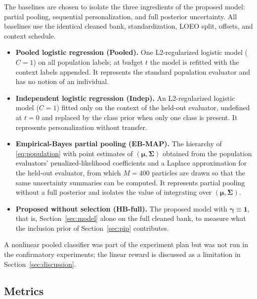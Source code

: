 \documentclass[lettersize,journal]{IEEEtran}
\begin{document}
The baselines are chosen to isolate the three ingredients of the proposed model: partial pooling, sequential personalization, and full posterior uncertainty. All baselines use the identical cleaned bank, standardization, LOEO split, offsets, and context schedule.

\begin{itemize}
  \item \textbf{Pooled logistic regression (Pooled).} One L2-regularized logistic model ($C=1$) on all population labels; at budget $t$ the model is refitted with the context labels appended. It represents the standard population evaluator and has no notion of an individual.
  \item \textbf{Independent logistic regression (Indep).} An L2-regularized logistic model ($C=1$) fitted only on the context of the held-out evaluator, undefined at $t=0$ and replaced by the class prior when only one class is present. It represents personalization without transfer.
  \item \textbf{Empirical-Bayes partial pooling (EB-MAP).} The hierarchy of \eqref{eq:population} with point estimates of $(\bm\mu,\bm\Sigma)$ obtained from the population evaluators' penalized-likelihood coefficients and a Laplace approximation for the held-out evaluator, from which $M=400$ particles are drawn so that the same uncertainty summaries can be computed. It represents partial pooling without a full posterior and isolates the value of integrating over $(\bm\mu,\bm\Sigma)$.
  \item \textbf{Proposed without selection (HB-full).} The proposed model with $\bm\gamma\equiv\bm 1$, that is, Section~\ref{sec:model} alone on the full cleaned bank, to measure what the inclusion prior of Section~\ref{sec:pip} contributes.
\end{itemize}
A nonlinear pooled classifier was part of the experiment plan but was not run in the confirmatory experiments; the linear reward is discussed as a limitation in Section~\ref{sec:discussion}.

\subsection{Metrics}
\label{sec:metrics}
\end{document}
